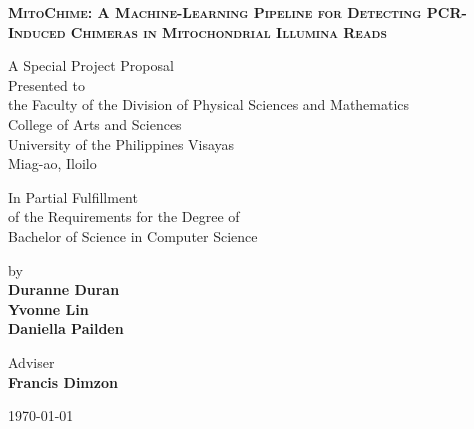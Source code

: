 \begin{titlepage}
\centering
{}

{\Large\bfseries\textsc{MitoChime: A Machine-Learning Pipeline for Detecting PCR-Induced Chimeras in Mitochondrial Illumina Reads}\par}

\vspace{1.5cm}
{\normalsize
A Special Project Proposal\\
Presented to\\
the Faculty of the Division of Physical Sciences and Mathematics\\
College of Arts and Sciences\\
University of the Philippines Visayas\\
Miag-ao, Iloilo
\par}

\vspace{1.5cm}
{\normalsize
In Partial Fulfillment\\
of the Requirements for the Degree of\\
Bachelor of Science in Computer Science
\par}

\vspace{1cm}
{\normalsize
by\\[0.5cm]
\textbf{Duranne Duran}\\
\textbf{Yvonne Lin}\\
\textbf{Daniella Pailden}
\par}

\vspace{1.5cm}
{\normalsize
Adviser\\
\textbf{Francis Dimzon}
\par}

\vspace*{\fill}
{\normalsize\today}

\end{titlepage}
